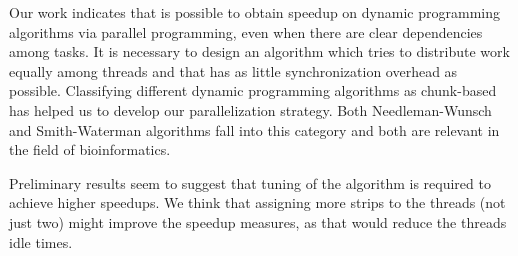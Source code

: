 \documentclass[journal]{IEEEtran}
\begin{document}
Our work indicates that is possible to obtain speedup on dynamic programming algorithms via parallel programming, even when there are clear dependencies among tasks. It is necessary to design an algorithm which tries to distribute work equally among threads and that has as little synchronization overhead as possible. Classifying different dynamic programming algorithms as chunk-based has helped us to develop our parallelization strategy. Both Needleman-Wunsch and Smith-Waterman algorithms fall into this category and both are relevant in the field of bioinformatics.

Preliminary results seem to suggest that tuning of the algorithm is required to achieve higher speedups. We think that assigning more strips to the threads (not just two) might improve the speedup measures, as that would reduce the threads idle times. 


\ifCLASSOPTIONcaptionsoff
  \newpage
\fi



\end{document}
